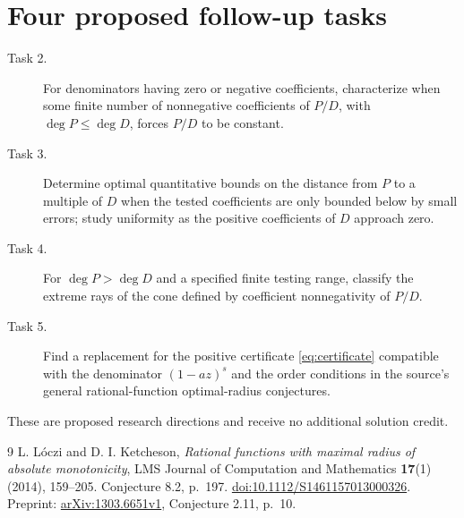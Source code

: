 \documentclass[11pt]{article}
\begin{document}
\section*{Four proposed follow-up tasks}
\begin{description}
\item[Task 2.] For denominators having zero or negative coefficients,
characterize when some finite number of nonnegative coefficients of
$P/D$, with $\deg P\le\deg D$, forces $P/D$ to be constant.
\item[Task 3.] Determine optimal quantitative bounds on the distance
from $P$ to a multiple of $D$ when the tested coefficients are only
bounded below by small errors; study uniformity as the positive
coefficients of $D$ approach zero.
\item[Task 4.] For $\deg P>\deg D$ and a specified finite testing
range, classify the extreme rays of the cone defined by
coefficient nonnegativity of $P/D$.
\item[Task 5.] Find a replacement for the positive certificate
\eqref{eq:certificate} compatible with the denominator $(1-az)^s$
and the order conditions in the source's general rational-function
optimal-radius conjectures.
\end{description}
These are proposed research directions and receive no additional
solution credit.

\begin{thebibliography}{9}
 L. L\'oczi and D. I. Ketcheson,
\emph{Rational functions with maximal radius of absolute monotonicity},
LMS Journal of Computation and Mathematics \textbf{17}(1) (2014),
159--205. Conjecture 8.2, p.~197.
\href{https://doi.org/10.1112/S1461157013000326}{doi:10.1112/S1461157013000326}.
Preprint: \href{https://arxiv.org/abs/1303.6651}{arXiv:1303.6651v1},
Conjecture 2.11, p.~10.
\end{thebibliography}
\end{document}
